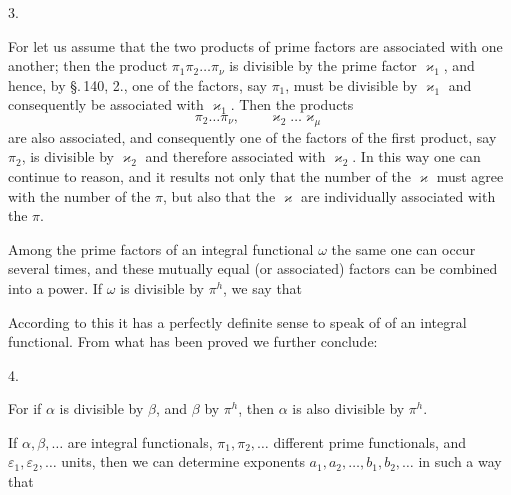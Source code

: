 3. 

For let us assume that the two products of prime factors
are associated with one another; then the product $\pi_1 \pi_2 \ldots \pi_\nu$ is divisible by the prime factor $\varkappa_1$, and hence, by \S.\,140, 2., one of the factors, say $\pi_1$, must be divisible by $\varkappa_1$ and consequently be associated with $\varkappa_1$. Then the products
\[
\pi_2 \ldots \pi_\nu, \qquad \varkappa_2 \ldots \varkappa_\mu
\]
are also associated, and consequently one of the factors of the first product, say $\pi_2$, is divisible by $\varkappa_2$ and therefore associated with $\varkappa_2$. In this way one can continue to reason, and it results not only that the number of the $\varkappa$ must agree with the number of the $\pi$, but also that the $\varkappa$ are individually associated with the $\pi$.

Among the prime factors of an integral functional $\omega$ the same one can occur several times, and these mutually equal (or associated) factors can be combined into a power. If $\omega$ is divisible by $\pi^h$, we say that 

According to this it has a perfectly definite sense to speak of  of an integral functional. From what has been proved we further conclude:

4. 

For if $\alpha$ is divisible by $\beta$, and $\beta$ by $\pi^h$, then $\alpha$ is also divisible by $\pi^h$.

If $\alpha, \beta, \ldots$ are integral functionals, $\pi_1, \pi_2, \ldots$ different prime functionals, and $\varepsilon_1, \varepsilon_2, \ldots$ units, then we can determine exponents $a_1, a_2, \ldots, b_1, b_2, \ldots$ in such a way that
